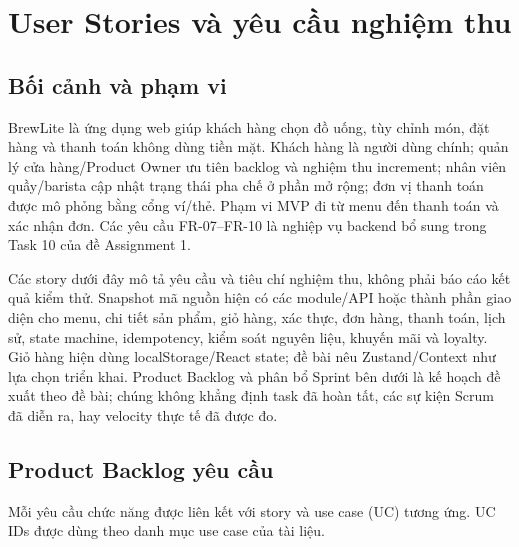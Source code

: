 \section{User Stories và yêu cầu nghiệm thu}
\label{sec:user-stories}

\subsection{Bối cảnh và phạm vi}
BrewLite là ứng dụng web giúp khách hàng chọn đồ uống, tùy chỉnh món, đặt hàng và thanh toán không dùng tiền mặt. Khách hàng là người dùng chính; quản lý cửa hàng/Product Owner ưu tiên backlog và nghiệm thu increment; nhân viên quầy/barista cập nhật trạng thái pha chế ở phần mở rộng; đơn vị thanh toán được mô phỏng bằng cổng ví/thẻ. Phạm vi MVP đi từ menu đến thanh toán và xác nhận đơn. Các yêu cầu FR-07--FR-10 là nghiệp vụ backend bổ sung trong Task 10 của đề Assignment 1.

Các story dưới đây mô tả yêu cầu và tiêu chí nghiệm thu, không phải báo cáo kết quả kiểm thử. Snapshot mã nguồn hiện có các module/API hoặc thành phần giao diện cho menu, chi tiết sản phẩm, giỏ hàng, xác thực, đơn hàng, thanh toán, lịch sử, state machine, idempotency, kiểm soát nguyên liệu, khuyến mãi và loyalty. Giỏ hàng hiện dùng localStorage/React state; đề bài nêu Zustand/Context như lựa chọn triển khai. Product Backlog và phân bổ Sprint bên dưới là kế hoạch đề xuất theo đề bài; chúng không khẳng định task đã hoàn tất, các sự kiện Scrum đã diễn ra, hay velocity thực tế đã được đo.

\subsection{Product Backlog yêu cầu}
Mỗi yêu cầu chức năng được liên kết với story và use case (UC) tương ứng. UC IDs được dùng theo danh mục use case của tài liệu.

